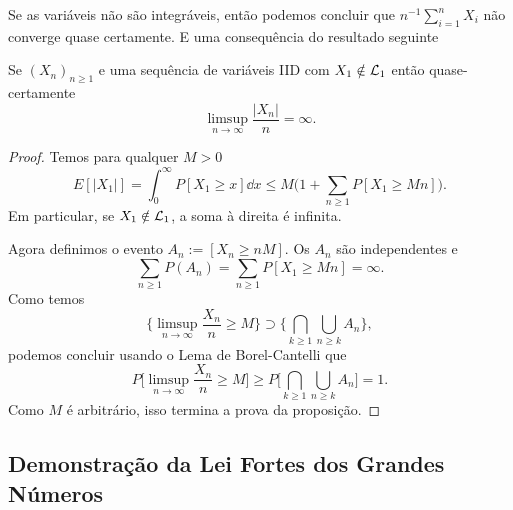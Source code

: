 Se as variáveis não são integráveis, então podemos concluir que $n^{-1}\sum_{i=1}^n X_i$ não converge quase certamente.
E uma consequência do resultado seguinte

\begin{proposition}
  Se $(X_n)_{n\ge 1}$ e uma sequência de variáveis IID com $X_1\notin {\ensuremath{\mathcal L}}_1$ então quase-certamente
  \begin{equation}
    \limsup_{n\to \infty} \frac{|X_n|}{n}=\infty.
  \end{equation}
\end{proposition}

\begin{proof}
  Temos para qualquer $M>0$
  \begin{equation}
    E[|X_1|]=\int_0^{\infty} P[X_1\ge x] \dd x \le  M
    \bigg(1+ \sum_{n\ge 1} P[X_1\ge Mn]\bigg).
  \end{equation}
  Em particular, se $X_1 \notin {\ensuremath{\mathcal L}}_1$, a soma à direita é infinita.

  Agora definimos o evento $A_n:= [X_n\ge nM]$.
  Os $A_n$ são independentes e
  \begin{equation}
    \sum_{n\ge 1} P(A_n) = \sum_{n\ge 1} P[X_1\ge Mn]=\infty.
  \end{equation}
  Como temos
  \begin{equation}
    \bigg\{ \limsup_{n\to \infty} \frac{X_n}{n}\ge M \bigg\} \supset \bigg\{  \bigcap_{k\ge 1} \bigcup_{n\ge k} A_n \bigg\},
  \end{equation}
  podemos concluir usando o Lema de Borel-Cantelli que
  \begin{equation}
    P\bigg[ \limsup_{n\to \infty} \frac{X_n}{n}\ge M\bigg]\ge P \bigg[ \bigcap_{k\ge 1} \bigcup_{n\ge k} A_n  \bigg] =1.
  \end{equation}
  Como $M$ é arbitrário, isso termina a prova da proposição.
\end{proof}

\subsection{Demonstração da Lei Fortes dos Grandes Números}


